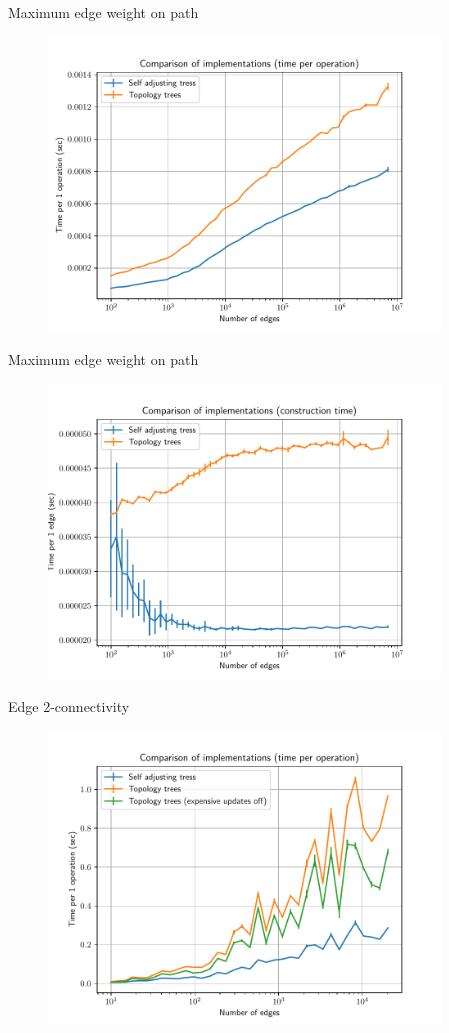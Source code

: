 \documentclass{beamer}				%
\begin{document}
\begin{frame}{Maximum edge weight on path}
	\vskip -3mm
	\begin{figure}
	\centering
	\includegraphics[width=10.4cm]{../charts/maximum_edge_weight_op.pdf}
	\end{figure}
\end{frame}

\begin{frame}{Maximum edge weight on path}
	\vskip -3mm
	\begin{figure}
	\centering
	\includegraphics[width=10.4cm]{../charts/maximum_edge_weight_construction.pdf}
	\end{figure}
\end{frame}


\begin{frame}{Edge 2-connectivity}
	\vskip -3mm
	\begin{figure}
	\centering
	\includegraphics[width=10.4cm]{../charts/double_edge_connectivity_op.pdf}
	\end{figure}
\end{frame}
\end{document}
